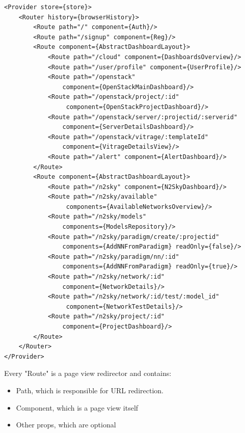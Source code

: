\begin{lstlisting}[caption=React Router]
<Provider store={store}>
	<Router history={browserHistory}>
		<Route path="/" component={Auth}/>
		<Route path="/signup" component={Reg}/>
		<Route component={AbstractDashboardLayout}>
			<Route path="/cloud" component={DashboardsOverview}/>
			<Route path="/user/profile" component={UserProfile}/>
			<Route path="/openstack" 
				component={OpenStackMainDashboard}/>
			<Route path="/openstack/project/:id"
				 component={OpenStackProjectDashboard}/>
			<Route path="/openstack/server/:projectid/:serverid" 
				component={ServerDetailsDashboard}/>
			<Route path="/openstack/vitrage/:templateId" 
				component={VitrageDetailsView}/>
			<Route path="/alert" component={AlertDashboard}/>
		</Route>
		<Route component={AbstractDashboardLayout}>
			<Route path="/n2sky" component={N2SkyDashboard}/>
			<Route path="/n2sky/available"
				 components={AvailableNetworksOverview}/>
			<Route path="/n2sky/models" 
				components={ModelsRepository}/>
			<Route path="/n2sky/paradigm/create/:projectid" 
				components={AddNNFromParadigm} readOnly={false}/>
			<Route path="/n2sky/paradigm/nn/:id" 
				components={AddNNFromParadigm} readOnly={true}/>
			<Route path="/n2sky/network/:id" 
				component={NetworkDetails}/>
			<Route path="/n2sky/network/:id/test/:model_id"
				 component={NetworkTestDetails}/>
			<Route path="/n2sky/project/:id"
				component={ProjectDashboard}/>
		</Route>
	</Router>
</Provider>
\end{lstlisting}

Every "Route" is a page view redirector and contains:
\begin{itemize}
\item Path, which is responsible for URL redirection.
\item Component, which is a page view itself
\item Other props, which are optional
\end{itemize}

